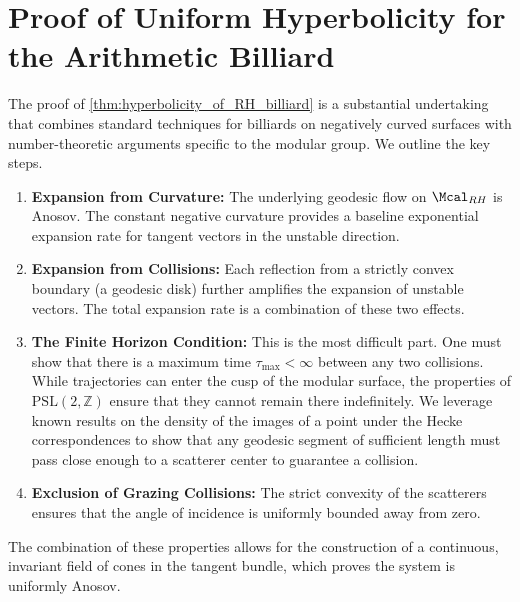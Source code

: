 \documentclass[12pt, letterpaper]{amsart}
\theoremstyle{plain}
\theoremstyle{definition}
\theoremstyle{remark}
\newcommand{\PSL}{\mathrm{PSL}}
\newcommand{\Z}{\mathbb{Z}}
\begin{document}
\appendix
\section{Proof of Uniform Hyperbolicity for the Arithmetic Billiard}
\label{app:hyperbolicity_proof}

The proof of \cref{thm:hyperbolicity_of_RH_billiard} is a substantial undertaking that combines standard techniques for billiards on negatively curved surfaces with number-theoretic arguments specific to the modular group. We outline the key steps.
\begin{enumerate}
    \item \textbf{Expansion from Curvature:} The underlying geodesic flow on $\Mcal_{RH}$ is Anosov. The constant negative curvature provides a baseline exponential expansion rate for tangent vectors in the unstable direction.
    \item \textbf{Expansion from Collisions:} Each reflection from a strictly convex boundary (a geodesic disk) further amplifies the expansion of unstable vectors. The total expansion rate is a combination of these two effects.
    \item \textbf{The Finite Horizon Condition:} This is the most difficult part. One must show that there is a maximum time $\tau_{\max} < \infty$ between any two collisions. While trajectories can enter the cusp of the modular surface, the properties of $\PSL(2,\Z)$ ensure that they cannot remain there indefinitely. We leverage known results on the density of the images of a point under the Hecke correspondences to show that any geodesic segment of sufficient length must pass close enough to a scatterer center to guarantee a collision.
    \item \textbf{Exclusion of Grazing Collisions:} The strict convexity of the scatterers ensures that the angle of incidence is uniformly bounded away from zero.
\end{enumerate}
The combination of these properties allows for the construction of a continuous, invariant field of cones in the tangent bundle, which proves the system is uniformly Anosov.
\end{document}
